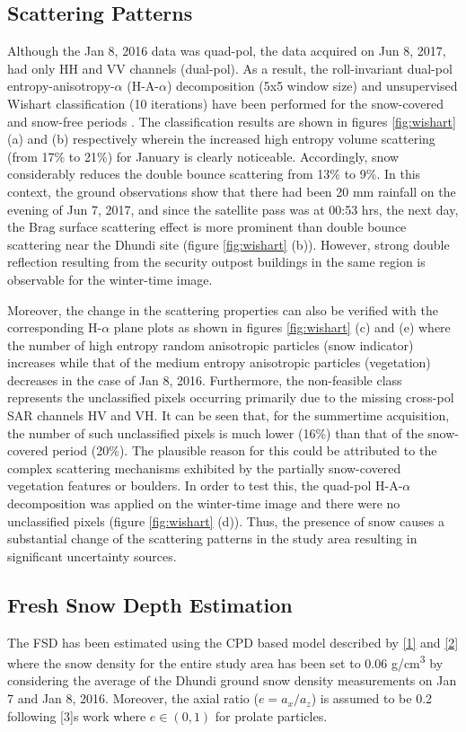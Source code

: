 \documentclass{article}
\begin{document}
\subsection{Scattering Patterns}
\label{ssec:scat}
Although the Jan 8, 2016 data was quad-pol, the data acquired on Jun 8, 2017, had only HH and VV channels (dual-pol). As a result, the roll-invariant dual-pol entropy-anisotropy-$\alpha$ (H-A-$\alpha$) decomposition (5x5 window size) and unsupervised Wishart classification (10 iterations) have been performed for the snow-covered and snow-free periods \cite{Singh2014}. The classification results are shown in figures \ref{fig:wishart} (a) and (b) respectively wherein the increased high entropy volume scattering (from 17\% to 21\%) for January is clearly noticeable. Accordingly, snow considerably reduces the double bounce scattering from 13\% to 9\%. In this context, the ground observations show that there had been 20 mm rainfall on the evening of Jun 7, 2017, and since the satellite pass was at 00:53 hrs, the next day, the Brag surface scattering effect is more prominent than double bounce scattering near the Dhundi site (figure \ref{fig:wishart} (b)). However, strong double reflection resulting from the security outpost buildings in the same region is observable for the winter-time image.  

Moreover, the change in the scattering properties can also be verified with the corresponding H-$\alpha$ plane plots as shown in figures \ref{fig:wishart} (c) and (e) where the number of high entropy random anisotropic particles (snow indicator) increases while that of the medium entropy anisotropic particles (vegetation) decreases in the case of Jan 8, 2016. Furthermore, the non-feasible class represents the unclassified pixels occurring primarily due to the missing cross-pol SAR channels HV and VH. It can be seen that, for the summertime acquisition, the number of such unclassified pixels is much lower (16\%) than that of the snow-covered period (20\%). The plausible reason for this could be attributed to the complex scattering mechanisms exhibited by the partially snow-covered vegetation features or boulders. In order to test this, the quad-pol H-A-$\alpha$ decomposition was applied on the winter-time image and there were no unclassified pixels (figure \ref{fig:wishart} (d)). Thus, the presence of snow causes a substantial change of the scattering patterns in the study area resulting in significant uncertainty sources.
\vspace{-1ex}
\subsection{Fresh Snow Depth Estimation}
\label{ssec:fsde}
The FSD has been estimated using the CPD based model described by \eqref{1} and \eqref{2} where the snow density for the entire study area has been set to 0.06 g/cm\textsuperscript{3} by considering the average of the Dhundi ground snow density measurements on Jan 7 and Jan 8, 2016. Moreover, the axial ratio ($e=a_x/a_z$) is assumed to be  0.2  following [3]\textquotesingle s work where $e \in (0,1)$ for prolate particles.
\end{document}
